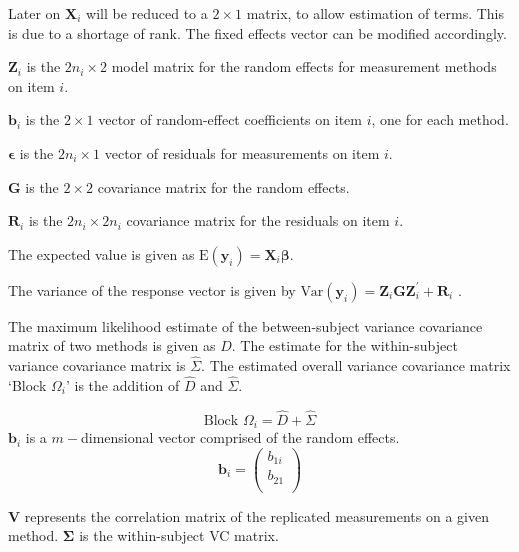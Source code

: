 \documentclass[12pt, a4paper]{report}
\theoremstyle{plain}
\theoremstyle{definition}
\theoremstyle{remark}
\begin{document}
Later on $\boldsymbol{X}_i$ will be reduced to a $2 \times 1$ matrix, to allow estimation of terms. This is due to a shortage of rank. The fixed effects vector can be modified accordingly.

$\boldsymbol{Z}_i$ is the $2n_i \times  2$ model matrix for the random effects for measurement methods on item $i$.\\
\bigskip

$\boldsymbol{b}_i$ is the $2 \times  1$ vector of random-effect coefficients on item $i$, one for each method.

$\boldsymbol{\epsilon}$  is the $2n_i \times  1$ vector of residuals for measurements on item $i$.\\
\bigskip

$\boldsymbol{G}$ is the $2 \times  2$ covariance matrix for the random effects.

$\boldsymbol{R}_i$ is the $2n_i \times  2n_i$ covariance matrix for the residuals on item $i$.

The expected value is given as $\mbox{E}(\boldsymbol{y}_i) = \boldsymbol{X}_i\boldsymbol{\beta}.$ \citep{hamlett}\\
\bigskip

The variance of the response vector is given by $\mbox{Var}(\boldsymbol{y}_i)  = \boldsymbol{Z}_i \boldsymbol{G} \boldsymbol{Z}_i^{\prime} + \boldsymbol{R}_i$ \citep{hamlett}.


The maximum likelihood estimate of the between-subject variance
covariance matrix of two methods is given as $D$. The estimate for
the within-subject variance covariance matrix is $\hat{\Sigma}$.
The estimated overall variance covariance matrix `Block $\Omega_{i}$' is the addition of $\hat{D}$ and $\hat{\Sigma}$.

\begin{equation}
\mbox{Block  }\Omega_{i} = \hat{D} + \hat{\Sigma}
\end{equation}
$\boldsymbol{b}_{i}$ is a $m-$dimensional vector comprised of
the random effects.
\begin{equation}
\boldsymbol{b}_{i} = \left( \begin{array}{c}
b_{1i} \\
b_{21}  \\
\end{array}\right)
\end{equation}


$\boldsymbol{V}$ represents the correlation matrix of the replicated measurements on a given method.
$\boldsymbol{\Sigma}$ is the within-subject VC matrix.\\
\bigskip
\end{document}
